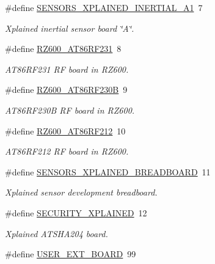 \begin{DoxyCompactItemize}
\#define \mbox{\hyperlink{group__group__common__boards_ga7796d1fa6e31b50714c391877e095801}{S\+E\+N\+S\+O\+R\+S\+\_\+\+X\+P\+L\+A\+I\+N\+E\+D\+\_\+\+I\+N\+E\+R\+T\+I\+A\+L\+\_\+\+A1}}~7
\begin{DoxyCompactList}\small\item\em Xplained inertial sensor board \char`\"{}\+A\char`\"{}. \end{DoxyCompactList}\item 
\#define \mbox{\hyperlink{group__group__common__boards_gab07c6fafd717c9bf1fcf482710a10f9d}{R\+Z600\+\_\+\+A\+T86\+R\+F231}}~8
\begin{DoxyCompactList}\small\item\em A\+T86\+R\+F231 RF board in R\+Z600. \end{DoxyCompactList}\item 
\#define \mbox{\hyperlink{group__group__common__boards_gabfbfb1013bb6a4eb8f445c7e06af3178}{R\+Z600\+\_\+\+A\+T86\+R\+F230B}}~9
\begin{DoxyCompactList}\small\item\em A\+T86\+R\+F230B RF board in R\+Z600. \end{DoxyCompactList}\item 
\#define \mbox{\hyperlink{group__group__common__boards_ga06539607f7c8a0104557c4b4cc7ac175}{R\+Z600\+\_\+\+A\+T86\+R\+F212}}~10
\begin{DoxyCompactList}\small\item\em A\+T86\+R\+F212 RF board in R\+Z600. \end{DoxyCompactList}\item 
\#define \mbox{\hyperlink{group__group__common__boards_ga80102032338e3add4f64cbc40efc4376}{S\+E\+N\+S\+O\+R\+S\+\_\+\+X\+P\+L\+A\+I\+N\+E\+D\+\_\+\+B\+R\+E\+A\+D\+B\+O\+A\+RD}}~11
\begin{DoxyCompactList}\small\item\em Xplained sensor development breadboard. \end{DoxyCompactList}\item 
\#define \mbox{\hyperlink{group__group__common__boards_ga00921a34b346ce468cedc9a09b58a881}{S\+E\+C\+U\+R\+I\+T\+Y\+\_\+\+X\+P\+L\+A\+I\+N\+ED}}~12
\begin{DoxyCompactList}\small\item\em Xplained A\+T\+S\+H\+A204 board. \end{DoxyCompactList}\item 
\#define \mbox{\hyperlink{group__group__common__boards_gaf75bc91f67cb2a761894691a9175a639}{U\+S\+E\+R\+\_\+\+E\+X\+T\+\_\+\+B\+O\+A\+RD}}~99
\end{DoxyCompactItemize}


